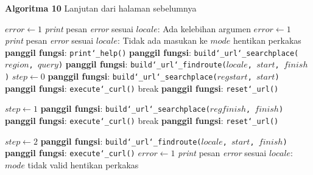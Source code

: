 \begin{algorithm}[h]
	\begin{center}
		\textbf{Algoritma 10} \textendash\xspace Lanjutan dari halaman sebelumnya
	\end{center}
	\begin{algorithmic}
			\State $error \gets 1$
			\State \textit{print} pesan \textit{error} sesuai $locale$: Ada kelebihan argumen
		\Else
					\State $error \gets 1$
					\State \textit{print} pesan \textit{error} sesuai $locale$: Tidak ada masukan ke $mode$
					\State hentikan perkakas
				\EndCase
					\State \textbf{panggil fungsi}: \texttt{print\char`_help()}
				\EndCase
					\State \textbf{panggil fungsi}: \texttt{build\char`_url\char`_searchplace($region$, $query$)}
				\EndCase
					\State \textbf{panggil fungsi}: \texttt{build\char`_url\char`_findroute($locale$, $start$, $finish$)}
				\EndCase
					\State $step \gets 0$
					\State \textbf{panggil fungsi}: \texttt{build\char`_url\char`_searchplace($regstart$, $start$)}
					\State \textbf{panggil fungsi}: \texttt{execute\char`_curl()}
						\State break
					\Else
						\State \textbf{panggil fungsi}: \texttt{reset\char`_url()}
					\EndIf
					
					\State $step \gets 1$
					\State \textbf{panggil fungsi}: \texttt{build\char`_url\char`_searchplace($regfinish$, $finish$)}
					\State \textbf{panggil fungsi}: \texttt{execute\char`_curl()}
						\State break
					\Else
						\State \textbf{panggil fungsi}: \texttt{reset\char`_url()}
					\EndIf
					
					\State $step \gets 2$
					\State \textbf{panggil fungsi}: \texttt{build\char`_url\char`_findroute($locale$, $start$, $finish$)}
					\State \textbf{panggil fungsi}: \texttt{execute\char`_curl()}
				\EndCase
				\Default
					\State $error \gets 1$
					\State \textit{print} pesan \textit{error} sesuai $locale$: $mode$ tidak valid
					\State hentikan perkakas
				\EndCase
			\EndSwitch
		\EndIf
		
		\State {}
	\end{algorithmic}
\end{algorithm}
